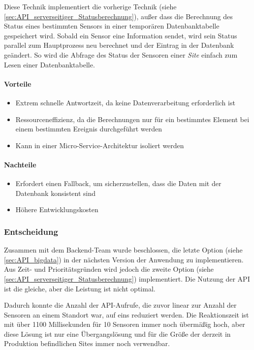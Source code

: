 Diese Technik implementiert die vorherige Technik (siehe \ref{sec:API_serverseitiger_Statusberechnung}), außer dass die Berechnung des Status eines bestimmten Sensors in einer temporären Datenbanktabelle gespeichert wird.
Sobald ein Sensor eine Information sendet, wird sein Status parallel zum Hauptprozess neu berechnet und der Eintrag in der Datenbank geändert.
So wird die Abfrage des Status der Sensoren einer \textit{Site} einfach zum Lesen einer Datenbanktabelle.

\paragraph{Vorteile}
\begin{itemize}
  \item Extrem schnelle Antwortzeit, da keine Datenverarbeitung erforderlich ist
  \item Ressourceneffizienz, da die Berechnungen nur für ein bestimmtes Element bei einem bestimmten Ereignis durchgeführt werden
  \item Kann in einer Micro-Service-Architektur isoliert werden
\end{itemize}

\paragraph{Nachteile}
\begin{itemize}
  \item Erfordert einen Fallback, um sicherzustellen, dass die Daten mit der Datenbank konsistent sind
  \item Höhere Entwicklungskosten
\end{itemize}

\subsubsection{Entscheidung}

Zusammen mit dem Backend-Team wurde beschlossen, die letzte Option (siehe \ref{sec:API_bigdata}) in der nächsten Version der Anwendung zu implementieren.
Aus Zeit- und Prioritätsgründen wird jedoch die zweite Option (siehe \ref{sec:API_serverseitiger_Statusberechnung}) implementiert.
Die Nutzung der API ist die gleiche, aber die Leistung ist nicht optimal.

Dadurch konnte die Anzahl der API-Aufrufe, die zuvor linear zur Anzahl der Sensoren an einem Standort war, auf eins reduziert werden.
Die Reaktionszeit ist mit über 1100 Millisekunden für 10 Sensoren immer noch übermäßig hoch, aber diese Lösung ist nur eine Übergangslösung und für die Größe der derzeit in Produktion befindlichen Sites immer noch verwendbar.

